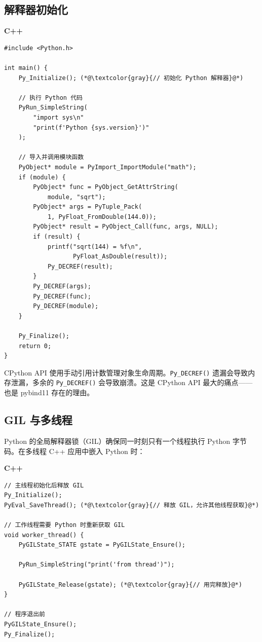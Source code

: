 \documentclass[12pt,a4paper,fontset=fandol]{ctexbook}
\newenvironment{warning}[1][]{%
  \begin{tcolorbox}[enhanced,breakable,
    colback=red!5!white,colframe=red!75!black,
    boxed title style={colback=red!75!black},
    attach boxed title to top left={yshift=-2mm,xshift=2mm},
    arc=2mm,boxrule=0.8mm,
    title={常见陷阱},#1]}%
  {\end{tcolorbox}}
\newcommand{\Fn}[1]{\texttt{#1()}}
\newcommand{\cpplabel}{%
  \noindent\begin{tcolorbox}[colback=algheadbg,coltext=white,
    sharp corners,boxrule=0pt,width=3.0em,height=1.4em,
    halign=center,valign=center,nobeforeafter,left=0pt,right=0pt,
    top=0pt,bottom=0pt]\small\bfseries C++\end{tcolorbox}}
\begin{document}
\subsection{解释器初始化}\label{sec:python-init}

\cpplabel
\begin{lstlisting}[style=cppstyle]
#include <Python.h>

int main() {
    Py_Initialize(); (*@\textcolor{gray}{// 初始化 Python 解释器}@*)

    // 执行 Python 代码
    PyRun_SimpleString(
        "import sys\n"
        "print(f'Python {sys.version}')"
    );

    // 导入并调用模块函数
    PyObject* module = PyImport_ImportModule("math");
    if (module) {
        PyObject* func = PyObject_GetAttrString(
            module, "sqrt");
        PyObject* args = PyTuple_Pack(
            1, PyFloat_FromDouble(144.0));
        PyObject* result = PyObject_Call(func, args, NULL);
        if (result) {
            printf("sqrt(144) = %f\n",
                   PyFloat_AsDouble(result));
            Py_DECREF(result);
        }
        Py_DECREF(args);
        Py_DECREF(func);
        Py_DECREF(module);
    }

    Py_Finalize();
    return 0;
}
\end{lstlisting}

\begin{warning}[title={引用计数}]
CPython API 使用手动引用计数管理对象生命周期。\Fn{Py\_DECREF} 遗漏会导致内存泄漏，多余的 \Fn{Py\_DECREF} 会导致崩溃。这是 CPython API 最大的痛点——也是 pybind11 存在的理由。
\end{warning}

\subsection{GIL 与多线程}\label{sec:python-gil}

Python 的全局解释器锁（GIL）确保同一时刻只有一个线程执行 Python 字节码。在多线程 C++ 应用中嵌入 Python 时：

\cpplabel
\begin{lstlisting}[style=cppstyle]
// 主线程初始化后释放 GIL
Py_Initialize();
PyEval_SaveThread(); (*@\textcolor{gray}{// 释放 GIL，允许其他线程获取}@*)

// 工作线程需要 Python 时重新获取 GIL
void worker_thread() {
    PyGILState_STATE gstate = PyGILState_Ensure();

    PyRun_SimpleString("print('from thread')");

    PyGILState_Release(gstate); (*@\textcolor{gray}{// 用完释放}@*)
}

// 程序退出前
PyGILState_Ensure();
Py_Finalize();
\end{lstlisting}
\end{document}

